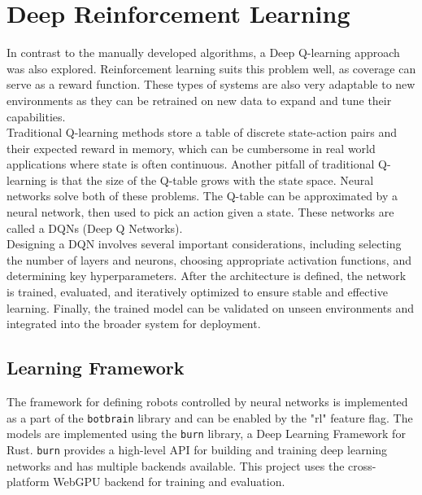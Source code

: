\section{Deep Reinforcement Learning}
\label{sec:rl}
In contrast to the manually developed algorithms, a Deep Q-learning approach was also explored. Reinforcement learning suits this problem well, as coverage can serve as a reward function. These types of systems are also very adaptable to new environments as they can be retrained on new data to expand and tune their capabilities. \\

Traditional Q-learning methods store a table of discrete state-action pairs and their expected reward in memory, which can be cumbersome in real world applications where state is often continuous. Another pitfall of traditional Q-learning is that the size of the Q-table grows with the state space. Neural networks solve both of these problems. The Q-table can be approximated by a neural network, then used to pick an action given a state. These networks are called a DQNs (Deep Q Networks). \\

Designing a DQN involves several important considerations, including selecting the number of layers and neurons, choosing appropriate activation functions, and determining key hyperparameters. After the architecture is defined, the network is trained, evaluated, and iteratively optimized to ensure stable and effective learning. Finally, the trained model can be validated on unseen environments and integrated into the broader system for deployment.


\subsection{Learning Framework}
The framework for defining robots controlled by neural networks is implemented as a part of the \texttt{botbrain} library and can be enabled by the "rl" feature flag. The models are implemented using the \texttt{burn} \cite{burn} library, a Deep Learning Framework for Rust. \texttt{burn} provides a high-level API for building and training deep learning networks and has multiple backends available. This project uses the cross-platform WebGPU backend \cite{wgpu} for training and evaluation. \\

